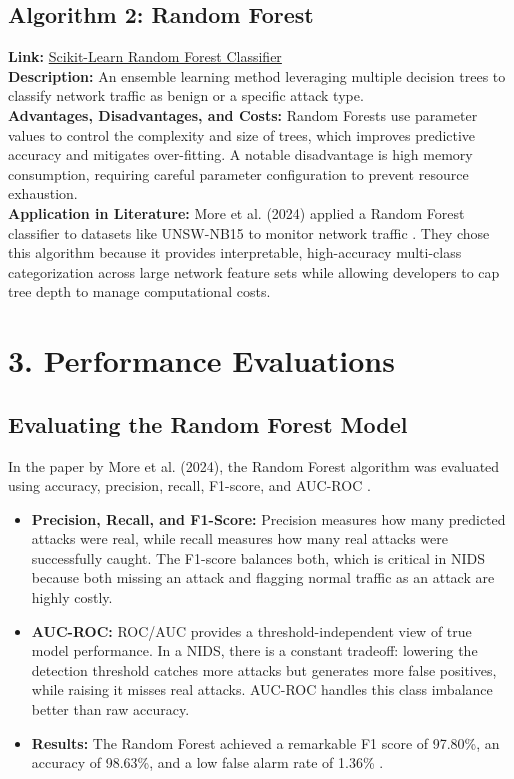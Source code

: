 \documentclass[letterpaper]{article}
\begin{document}
\subsection*{Algorithm 2: Random Forest}
\textbf{Link:} \href{https://scikit-learn.org/stable/modules/generated/sklearn.ensemble.RandomForestClassifier.html}{Scikit-Learn Random Forest Classifier} \\
\textbf{Description:} An ensemble learning method leveraging multiple decision trees to classify network traffic as benign or a specific attack type. \\
\textbf{Advantages, Disadvantages, and Costs:} Random Forests use parameter values to control the complexity and size of trees, which improves predictive accuracy and mitigates over-fitting. A notable disadvantage is high memory consumption, requiring careful parameter configuration to prevent resource exhaustion. \\
\textbf{Application in Literature:} More et al. (2024) applied a Random Forest classifier to datasets like UNSW-NB15 to monitor network traffic \cite{more2024}. They chose this algorithm because it provides interpretable, high-accuracy multi-class categorization across large network feature sets while allowing developers to cap tree depth to manage computational costs.
\vspace{1em}

\pagebreak

\section{3. Performance Evaluations}

\subsection*{Evaluating the Random Forest Model}
In the paper by More et al. (2024), the Random Forest algorithm was evaluated using accuracy, precision, recall, F1-score, and AUC-ROC \cite{more2024}. 
\begin{itemize}
    \item \textbf{Precision, Recall, and F1-Score:} Precision measures how many predicted attacks were real, while recall measures how many real attacks were successfully caught. The F1-score balances both, which is critical in NIDS because both missing an attack and flagging normal traffic as an attack are highly costly.
    \item \textbf{AUC-ROC:} ROC/AUC provides a threshold-independent view of true model performance. In a NIDS, there is a constant tradeoff: lowering the detection threshold catches more attacks but generates more false positives, while raising it misses real attacks. AUC-ROC handles this class imbalance better than raw accuracy.
    \item \textbf{Results:} The Random Forest achieved a remarkable F1 score of 97.80\%, an accuracy of 98.63\%, and a low false alarm rate of 1.36\% \cite{more2024}.
\end{itemize}
\end{document}
